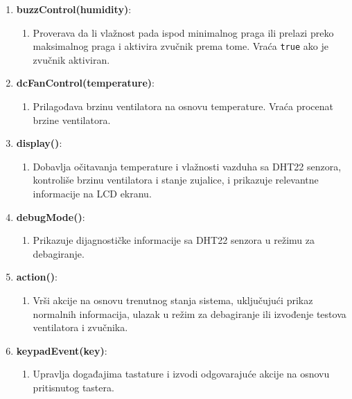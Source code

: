 \documentclass[a4paper, 12pt]{article}
\begin{document}
\begin{enumerate}[label=\arabic*.,leftmargin=*]
    \item \textbf{buzzControl(humidity)}:
        \begin{enumerate}[label={},leftmargin=*]
            \item Proverava da li vlažnost pada ispod minimalnog praga ili prelazi preko maksimalnog praga i aktivira zvučnik prema tome. Vraća \texttt{true} ako je zvučnik aktiviran.
        \end{enumerate}
        
    \item \textbf{dcFanControl(temperature)}:
        \begin{enumerate}[label={},leftmargin=*] 
            \item Prilagođava brzinu ventilatora na osnovu temperature. Vraća procenat brzine ventilatora.
        \end{enumerate}
        
    \item \textbf{display()}:
        \begin{enumerate}[label={},leftmargin=*]
            \item Dobavlja očitavanja temperature i vlažnosti vazduha sa DHT22 senzora, kontroliše brzinu ventilatora i stanje zujalice, i prikazuje relevantne informacije na LCD ekranu.
        \end{enumerate}
        
    \item \textbf{debugMode()}:
        \begin{enumerate}[label={},leftmargin=*] 
            \item Prikazuje dijagnostičke informacije sa DHT22 senzora u režimu za debagiranje.
        \end{enumerate}
        
    \item \textbf{action()}:
        \begin{enumerate}[label={},leftmargin=*] 
            \item Vrši akcije na osnovu trenutnog stanja sistema, uključujući prikaz normalnih informacija, ulazak u režim za debagiranje ili izvođenje testova ventilatora i zvučnika.
        \end{enumerate}
        
    \item \textbf{keypadEvent(key)}:
        \begin{enumerate}[label={},leftmargin=*] 
            \item Upravlja događajima tastature i izvodi odgovarajuće akcije na osnovu pritisnutog tastera.
        \end{enumerate}
        

\end{enumerate}
\end{document}
